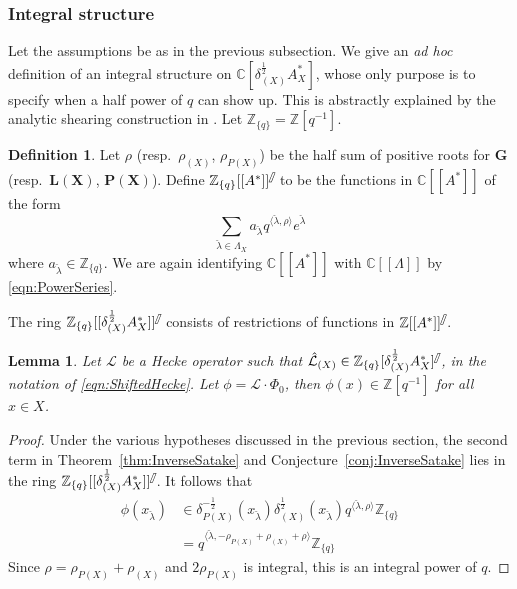 \documentclass{amsart}
\newtheorem{lemma}[theorem]{Lemma}
\theoremstyle{definition}
\newtheorem{definition}[theorem]{Definition}
\theoremstyle{remark}
\newcommand{\1}{\mathbf{1}}
\newcommand{\bra}{\langle}
\newcommand{\C}{\mathbb{C}}
\newcommand{\ket}{\rangle}
\newcommand{\mb}[1]{\mathbf{#1}}
\newcommand{\sh}[1]{\mathcal{#1}}
\newcommand{\Z}{\mathbb{Z}}
\theoremstyle{definition}
\newcommand{\shear}{{\mathbin{\mkern-6mu\fatslash}}}
\begin{document}
\subsubsection{Integral structure}
Let the assumptions be as in the previous subsection. We give an \emph{ad hoc} definition of an integral structure on $\C[\delta_{(X)}^{\frac{1}{2}}A_X^*]$, whose only purpose is to specify when a half power of $q$ can show up. This is abstractly explained by the analytic shearing construction in \cite[\S 6.8]{BZSV}. Let $\Z_{\{q\}}=\Z[q^{-1}]$.

\begin{definition}\label{defn:Shear}
  Let $\rho$ (resp.~$\rho_{(X)}$, $\rho_{P(X)}$) be the half sum of positive roots for $\mb{G}$ (resp.~$\mb{L}(\mb{X})$, $\mb{P}(\mb{X})$). Define $\Z_{\{q\}}[[A^*]]^{\shear}$ to be the functions in $\C[[A^*]]$ of the form
  \[
    \sum_{\check{\lambda}\in\Lambda_X}a_{\check{\lambda}}q^{\bra\check\lambda,\rho\ket}e^{\check{\lambda}}
  \]
  where $a_{\check{\lambda}}\in\Z_{\{q\}}$. We are again identifying $\C[[A^*]]$ with $\C[[\Lambda]]$ by \eqref{eqn:PowerSeries}.

  The ring $\Z_{\{q\}}[[\delta_{(X)}^{\frac{1}{2}}A_X^*]]^{\shear}$ consists of restrictions of functions in $\Z[[A^*]]^{\shear}$. 
\end{definition}

\begin{lemma}\label{lem:Integral}
    Let $\sh{L}$ be a Hecke operator such that $\hat{\sh{L}}_{(X)}\in\Z_{\{q\}}[\delta_{(X)}^{\frac{1}{2}}A_X^*]^{\shear}$, in the notation of \eqref{eqn:ShiftedHecke}. Let $\phi=\sh{L}\cdot\Phi_0$, then $\phi(x)\in\Z[q^{-1}]$ for all $x\in X$.
\end{lemma}
\begin{proof}
  Under the various hypotheses discussed in the previous section, the second term in Theorem~\ref{thm:InverseSatake} and Conjecture~\ref{conj:InverseSatake} lies in the ring $\Z_{\{q\}}[[\delta^{\frac{1}{2}}_{(X)}A_X^*]]^\shear$. It follows that
  \begin{align*}
    \phi(x_{\check{\lambda}})&\in\delta_{P(X)}^{-\frac{1}{2}}(x_{\check\lambda})\delta_{(X)}^{\frac{1}{2}}(x_{\check\lambda})q^{\bra\check{\lambda},\rho\ket}\Z_{\{q\}}\\
    &=q^{\bra\check\lambda,-\rho_{P(X)}+\rho_{(X)}+\rho\ket}\Z_{\{q\}}
  \end{align*}
  Since $\rho=\rho_{P(X)}+\rho_{(X)}$ and $2\rho_{P(X)}$ is integral, this is an integral power of $q$.
\end{proof} 
\end{document}
